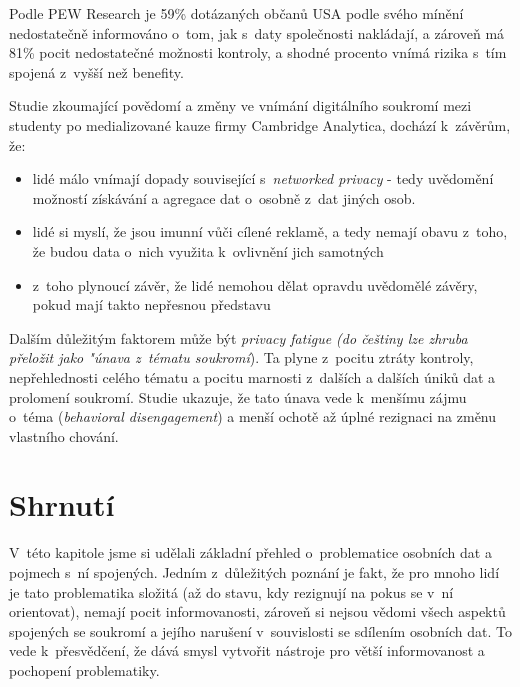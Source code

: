 Podle PEW Research je 59\% dotázaných občanů USA podle svého mínění nedostatečně informováno o~tom, jak s~daty společnosti nakládají, a zároveň má 81\% pocit nedostatečné možnosti kontroly, a shodné procento vnímá rizika s~tím spojená z~vyšší než benefity.\citep{lack-of-control}

Studie\citep{privacy-awareness} zkoumající povědomí a změny ve vnímání digitálního soukromí mezi studenty po medializované kauze firmy Cambridge Analytica, dochází k~závěrům, že:

\begin{itemize}
	\item lidé málo vnímají dopady související s~\textit{networked privacy} - tedy uvědomění možností získávání a agregace dat o~osobně z~dat jiných osob.
	\item lidé si myslí, že jsou imunní vůči cílené reklamě, a tedy nemají obavu z~toho, že budou data o~nich využita k~ovlivnění jich samotných
	\item z~toho plynoucí závěr, že lidé nemohou dělat opravdu uvědomělé závěry, pokud mají takto nepřesnou představu
\end{itemize}

Dalším důležitým faktorem může být \textit{privacy fatigue (do češtiny lze zhruba přeložit jako "únava z~tématu soukromí})\citep{privacy-fatigue}. Ta plyne z~pocitu ztráty kontroly, nepřehlednosti celého tématu a pocitu marnosti z~dalších a dalších úniků dat a prolomení soukromí. Studie ukazuje, že tato únava vede k~menšímu zájmu o~téma (\textit{behavioral disengagement}) a menší ochotě až úplné rezignaci na změnu vlastního chování.

\section{Shrnutí}
V~této kapitole jsme si udělali základní přehled o~problematice osobních dat a pojmech s~ní spojených.
Jedním z~důležitých poznání je fakt, že pro mnoho lidí je tato problematika složitá (až do stavu, kdy rezignují na pokus se v~ní orientovat), nemají pocit informovanosti, zároveň si nejsou vědomi všech aspektů spojených se soukromí a jejího narušení v~souvislosti se sdílením osobních dat. To vede k~přesvědčení, že dává smysl vytvořit nástroje pro větší informovanost a pochopení problematiky.